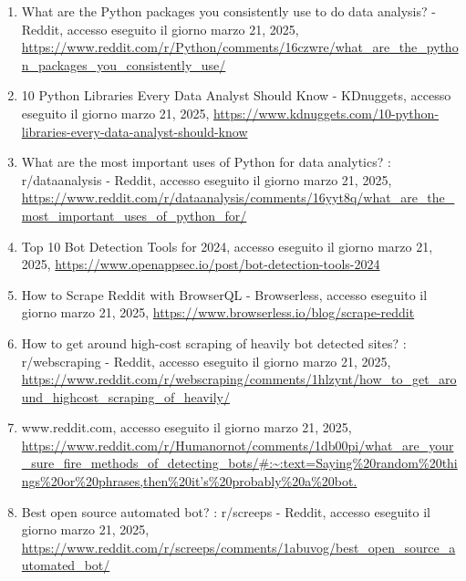 \documentclass[
  12pt,
  letterpaper,
  DIV=11,
  numbers=noendperiod]{scrartcl}
\begin{document}
\begin{enumerate}
\item
  What are the Python packages you consistently use to do data analysis?
  - Reddit, accesso eseguito il giorno marzo 21, 2025,
  \url{https://www.reddit.com/r/Python/comments/16czwre/what_are_the_python_packages_you_consistently_use/}\\
\item
  10 Python Libraries Every Data Analyst Should Know - KDnuggets,
  accesso eseguito il giorno marzo 21, 2025,
  \url{https://www.kdnuggets.com/10-python-libraries-every-data-analyst-should-know}\\
\item
  What are the most important uses of Python for data analytics? :
  r/dataanalysis - Reddit, accesso eseguito il giorno marzo 21, 2025,
  \url{https://www.reddit.com/r/dataanalysis/comments/16yyt8q/what_are_the_most_important_uses_of_python_for/}\\
\item
  Top 10 Bot Detection Tools for 2024, accesso eseguito il giorno marzo
  21, 2025,
  \url{https://www.openappsec.io/post/bot-detection-tools-2024}\\
\item
  How to Scrape Reddit with BrowserQL - Browserless, accesso eseguito il
  giorno marzo 21, 2025,
  \url{https://www.browserless.io/blog/scrape-reddit}\\
\item
  How to get around high-cost scraping of heavily bot detected sites? :
  r/webscraping - Reddit, accesso eseguito il giorno marzo 21, 2025,
  \url{https://www.reddit.com/r/webscraping/comments/1hlzynt/how_to_get_around_highcost_scraping_of_heavily/}\\
\item
  www.reddit.com, accesso eseguito il giorno marzo 21, 2025,
  \href{https://www.reddit.com/r/Humanornot/comments/1db00pi/what_are_your_sure_fire_methods_of_detecting_bots/\#:~:text=Saying\%20random\%20things\%20or\%20phrases,then\%20it's\%20probably\%20a\%20bot.}{https://www.reddit.com/r/Humanornot/comments/1db00pi/what\_are\_your\_sure\_fire\_methods\_of\_detecting\_bots/\#:\textasciitilde:text=Saying\%20random\%20things\%20or\%20phrases,then\%20it's\%20probably\%20a\%20bot.}\\
\item
  Best open source automated bot? : r/screeps - Reddit, accesso eseguito
  il giorno marzo 21, 2025,
  \url{https://www.reddit.com/r/screeps/comments/1abuvog/best_open_source_automated_bot/}\\

\end{enumerate}
\end{document}
